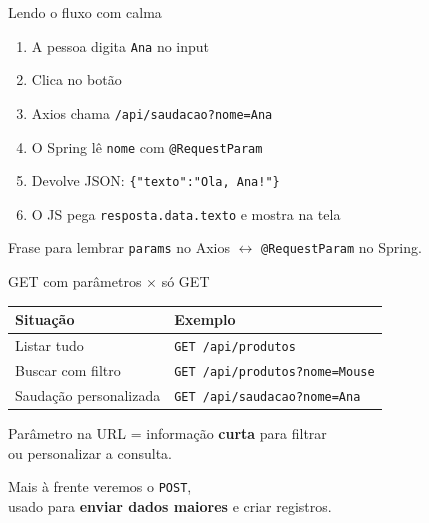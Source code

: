 \documentclass[aspectratio=169,11pt]{beamer}
\begin{document}
\begin{frame}{Lendo o fluxo com calma}
  \begin{enumerate}
    \item A pessoa digita \texttt{Ana} no input
    \item Clica no botão
    \item Axios chama \texttt{/api/saudacao?nome=Ana}
    \item O Spring lê \texttt{nome} com \texttt{@RequestParam}
    \item Devolve JSON: \texttt{\{"texto":"Ola, Ana!"\}}
    \item O JS pega \texttt{resposta.data.texto} e mostra na tela
  \end{enumerate}

  \vspace{0.6em}
  \begin{block}{Frase para lembrar}
    \texttt{params} no Axios $\leftrightarrow$ \texttt{@RequestParam} no Spring.
  \end{block}
\end{frame}

\begin{frame}{GET com parâmetros $\times$ só GET}
  \begin{center}
  \begin{tabular}{ll}
    \toprule
    Situação & Exemplo \\
    \midrule
    Listar tudo & \texttt{GET /api/produtos} \\
    Buscar com filtro & \texttt{GET /api/produtos?nome=Mouse} \\
    Saudação personalizada & \texttt{GET /api/saudacao?nome=Ana} \\
    \bottomrule
  \end{tabular}
  \end{center}

  \vspace{0.7em}
  Parâmetro na URL = informação \textbf{curta} para filtrar\\
  ou personalizar a consulta.

  \vspace{0.4em}
  Mais à frente veremos o \texttt{POST},\\
  usado para \textbf{enviar dados maiores} e criar registros.
\end{frame}
\end{document}
